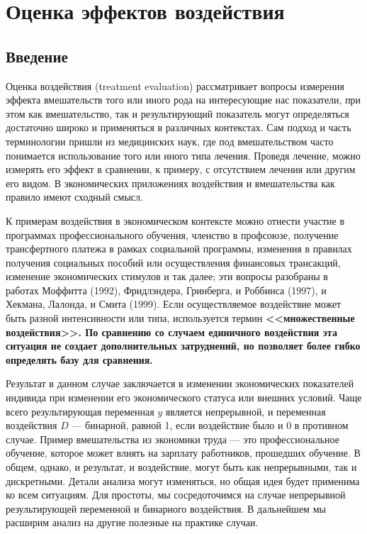 
\chapter{Оценка эффектов воздействия}

\section{Введение}

Оценка воздействия (treatment evaluation) рассматривает вопросы измерения эффекта вмешательств того или иного рода на интересующие нас показатели, при этом как вмешательство, так и результирующий показатель могут определяться достаточно широко и применяться в различных контекстах. Сам подход и часть терминологии пришли из медицинских наук, где под вмешательством часто понимается использование того или иного типа лечения. Проведя лечение, можно измерять его эффект в сравнении, к примеру, с отсутствием лечения или другим его видом. В экономических приложениях воздействия и вмешательства как правило имеют сходный смысл. 

К примерам воздействия в экономическом контексте можно отнести участие в программах профессионального обучения, членство в профсоюзе, получение трансфертного платежа в рамках социальной программы, изменения в правилах получения социальных пособий или осуществления финансовых трансакций, изменение экономических стимулов и так далее; эти вопросы разобраны в работах Моффитта (1992), Фридлэндера, Гринберга, и
Роббинса (1997), и Хекмана, Лалонда, и Смита (1999). Если осуществляемое воздействие может быть разной интенсивности или типа, используется термин  \bfseries <<множественные воздействия>>. \mdseries По сравнению со случаем единичного воздействия эта ситуация не создает дополнительных затруднений, но позволяет более гибко определять базу для сравнения. 

Результат в данном случае заключается в изменении экономических показателей индивида при изменении его экономического статуса или внешних условий. Чаще всего результирующая переменная $y$ является непрерывной, и переменная воздействия $D$ --- бинарной, равной 1, если воздействие было и 0 в противном случае. Пример вмешательства из экономики труда --- это профессиональное обучение, которое может влиять на зарплату работников, прошедших обучение. В общем, однако, и результат, и воздействие, могут быть как непрерывными, так и дискретными. Детали анализа могут изменяться, но общая идея будет применима ко всем ситуациям. Для простоты, мы сосредоточимся на случае непрерывной результирующей переменной и бинарного воздействия. В дальнейшем мы расширим анализ на другие полезные на практике случаи. 

